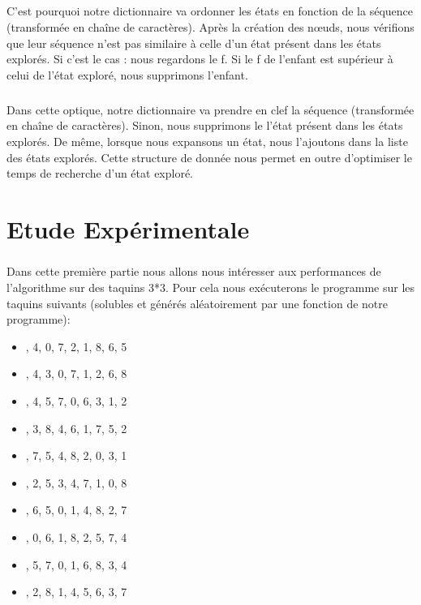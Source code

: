 \documentclass[10pt,a4paper]{report}
\begin{document}
\paragraph{}{C'est pourquoi notre dictionnaire va ordonner les états en fonction de la séquence (transformée en chaîne de caractères). Après la création des nœuds, nous vérifions que leur séquence n'est pas similaire à celle d'un état présent dans les états explorés. Si c'est le cas : nous regardons le f. Si le f de l'enfant est supérieur à celui de l'état exploré, nous supprimons l'enfant.}
\paragraph{}{Dans cette optique, notre dictionnaire va prendre en clef la séquence (transformée en chaîne de caractères). Sinon, nous supprimons le l'état présent dans les états explorés. De même, lorsque nous expansons un état, nous l'ajoutons dans la liste des états explorés. Cette structure de donnée nous permet en outre d'optimiser le temps de recherche d'un état exploré.}



\chapter{Etude Expérimentale}
\paragraph{}{Dans cette première partie nous allons nous intéresser aux performances de l'algorithme sur des taquins 3*3. Pour cela nous exécuterons le programme sur les taquins suivants (solubles et générés aléatoirement par une fonction de notre programme): }
\begin{itemize}
\item {\ttfamily{}, 4, 0, 7, 2, 1, 8, 6, 5\rbrack}
\item {\ttfamily{}, 4, 3, 0, 7, 1, 2, 6, 8\rbrack}
\item {\ttfamily{}, 4, 5, 7, 0, 6, 3, 1, 2\rbrack}
\item {\ttfamily{}, 3, 8, 4, 6, 1, 7, 5, 2\rbrack}
\item {\ttfamily{}, 7, 5, 4, 8, 2, 0, 3, 1\rbrack}
\item {\ttfamily{}, 2, 5, 3, 4, 7, 1, 0, 8\rbrack}
\item {\ttfamily{}, 6, 5, 0, 1, 4, 8, 2, 7\rbrack}
\item {\ttfamily{}, 0, 6, 1, 8, 2, 5, 7, 4\rbrack}
\item {\ttfamily{}, 5, 7, 0, 1, 6, 8, 3, 4\rbrack}
\item {\ttfamily{}, 2, 8, 1, 4, 5, 6, 3, 7\rbrack}
\end{itemize}
\end{document}
